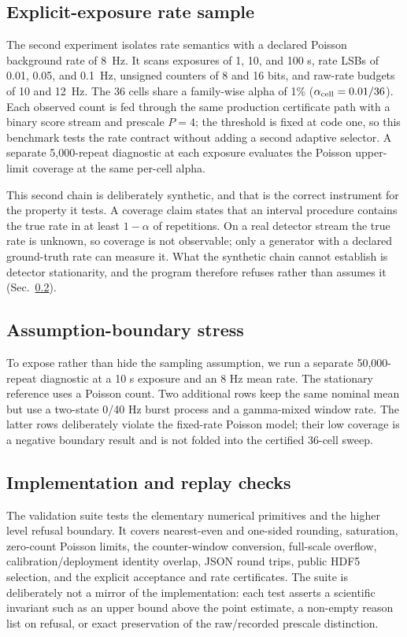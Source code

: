\documentclass[preprint,12pt]{elsarticle}
\begin{document}
\subsection{Explicit-exposure rate sample}

The second experiment isolates rate semantics with a declared Poisson
background rate of \SI{8}{Hz}.  It scans exposures of 1, 10, and 100 s, rate
LSBs of 0.01, 0.05, and \SI{0.1}{Hz}, unsigned counters of 8 and 16 bits, and
raw-rate budgets of 10 and \SI{12}{Hz}.  The 36 cells share a family-wise
alpha of 1\% ($\alpha_{\rm cell}=0.01/36$).  Each observed count is fed through
the same production certificate path with a binary score stream and prescale
$P=4$; the threshold is fixed at code one, so this benchmark tests the rate
contract without adding a second adaptive selector.  A separate 5,000-repeat
diagnostic at each exposure evaluates the Poisson upper-limit coverage at the
same per-cell alpha.

This second chain is deliberately synthetic, and that is the correct
instrument for the property it tests.  A coverage claim states that an interval
procedure contains the true rate in at least $1-\alpha$ of repetitions.  On a
real detector stream the true rate is unknown, so coverage is not observable;
only a generator with a declared ground-truth rate can measure it.  What the
synthetic chain cannot establish is detector stationarity, and the program
therefore refuses rather than assumes it (Sec.~\ref{sec:boundary}).

\subsection{Assumption-boundary stress}
\label{sec:boundary}

To expose rather than hide the sampling assumption, we run a separate
50,000-repeat diagnostic at a 10 s exposure and an 8 Hz mean rate.  The
stationary reference uses a Poisson count.  Two additional rows keep the same
nominal mean but use a two-state 0/40 Hz burst process and a gamma-mixed
window rate.  The latter rows deliberately violate the fixed-rate Poisson
model; their low coverage is a negative boundary result and is not folded into
the certified 36-cell sweep.

\subsection{Implementation and replay checks}

The validation suite tests the elementary numerical primitives and the higher
level refusal boundary.  It covers nearest-even and one-sided rounding,
saturation, zero-count Poisson limits, the counter-window conversion, full-scale
overflow, calibration/deployment identity overlap, JSON round trips, public
HDF5 selection, and the explicit acceptance and rate certificates.  The suite
is deliberately not a mirror of the implementation: each test asserts a
scientific invariant such as an upper bound above the point estimate, a
non-empty reason list on refusal, or exact preservation of the raw/recorded
prescale distinction.
\end{document}

